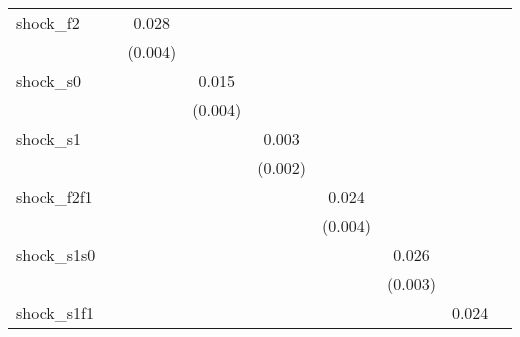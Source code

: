 {\begin{tabular}{l*{8}{c}}
\addlinespace
shock\_f2    &                     &       0.028\sym{***}&                     &                     &                     &                     &                     &                     \\
            &                     &     (0.004)         &                     &                     &                     &                     &                     &                     \\
\addlinespace
shock\_s0    &                     &                     &       0.015\sym{***}&                     &                     &                     &                     &                     \\
            &                     &                     &     (0.004)         &                     &                     &                     &                     &                     \\
\addlinespace
shock\_s1    &                     &                     &                     &       0.003         &                     &                     &                     &                     \\
            &                     &                     &                     &     (0.002)         &                     &                     &                     &                     \\
\addlinespace
shock\_f2f1  &                     &                     &                     &                     &       0.024\sym{***}&                     &                     &                     \\
            &                     &                     &                     &                     &     (0.004)         &                     &                     &                     \\
\addlinespace
shock\_s1s0  &                     &                     &                     &                     &                     &       0.026\sym{***}&                     &                     \\
            &                     &                     &                     &                     &                     &     (0.003)         &                     &                     \\
\addlinespace
shock\_s1f1  &                     &                     &                     &                     &                     &                     &       0.024\sym{***}&                     \\

\end{tabular}}
